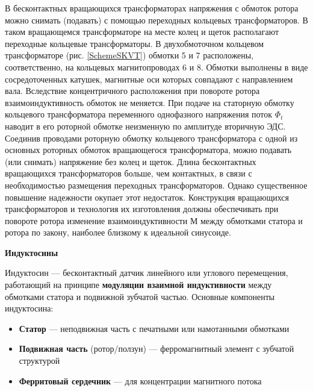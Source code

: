 В бесконтактных вращающихся трансформаторах напряжения с обмоток ротора можно снимать (подавать) с помощью переходных кольцевых трансформаторов.
В таком вращающемся трансформаторе на месте колец и щеток располагают переходные кольцевые трансформаторы. 
В двухобмоточном кольцевом трансформаторе (рис. \ref{SchemeSKVT}) обмотки 5 и 7 расположены, соответственно, на кольцевых магнитопроводах 6 и 8.    
Обмотки выполнены в виде сосредоточенных катушек, магнитные оси которых совпадают с направлением вала. Вследствие концентричного расположения при повороте ротора взаимоиндуктивность 
обмоток не меняется. При подаче на статорную обмотку кольцевого трансформатора переменного однофазного напряжения поток $ \Phi_t $ наводит в его роторной обмотке неизменную по амплитуде вторичную ЭДС. Соединив проводами роторную обмотку кольцевого трансформатора с одной из основных роторных обмоток вращающегося трансформатора, можно подавать (или снимать) напряжение без колец и щеток. Длина бесконтактных вращающихся трансформаторов больше, чем контактных, в связи с необходимостью размещения переходных трансформаторов. Однако существенное повышение надежности окупает этот недостаток. Конструкция вращающихся трансформаторов и технология их изготовления должны обеспечивать при повороте ротора изменение взаимоиндуктивности М между обмотками статора и ротора по закону, наиболее близкому к идеальной синусоиде.





\textbf{Индуктосины}



Индуктосин — бесконтактный датчик линейного или углового перемещения, работающий на принципе \textbf{модуляции взаимной индуктивности} между обмотками статора и подвижной зубчатой частью. 
Основные компоненты индуктосина:
\begin{itemize}
    \item \textbf{Статор} — неподвижная часть с печатными или намотанными обмотками
    \item \textbf{Подвижная часть} (ротор/ползун) — ферромагнитный элемент с зубчатой структурой
    \item \textbf{Ферритовый сердечник} — для концентрации магнитного потока
\end{itemize}


